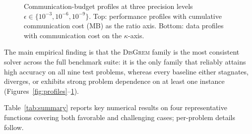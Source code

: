 \documentclass[review,onefignum,onetabnum]{siamart171218}
\begin{document}
	\begin{figure}[htbp]
		\centering
		\caption{Communication-budget profiles at three precision levels
			$\epsilon\in\{10^{-3},10^{-6},10^{-9}\}$.
			Top: performance profiles with cumulative communication cost (MB)
			as the ratio axis.
			Bottom: data profiles with communication cost on the $\kappa$-axis.}
		\label{fig:profiles_comm}
	\end{figure}
	The main empirical finding is that the \textsc{DisGrem} family is the
	most consistent solver across the full benchmark suite:
	it is the only family that reliably attains high accuracy on all nine
	test problems, whereas every baseline either stagnates, diverges, or
	exhibits strong problem dependence on at least one instance
	(Figures~\ref{fig:profiles}--\ref{fig:profiles_comm}).

	Table~\ref{tab:summary} reports key numerical results on four
	representative functions covering both favorable and challenging
	cases; per-problem details follow.
	
\end{document}
